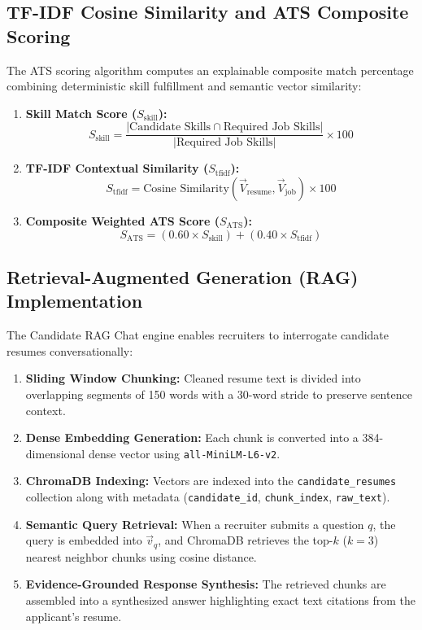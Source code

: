 \subsection{TF-IDF Cosine Similarity and ATS Composite Scoring}
The ATS scoring algorithm computes an explainable composite match percentage combining deterministic skill fulfillment and semantic vector similarity:
\begin{enumerate}
    \item \textbf{Skill Match Score ($S_{\text{skill}}$):}
    \begin{equation}
        S_{\text{skill}} = \frac{|\text{Candidate Skills} \cap \text{Required Job Skills}|}{|\text{Required Job Skills}|} \times 100
    \end{equation}
    \item \textbf{TF-IDF Contextual Similarity ($S_{\text{tfidf}}$):}
    \begin{equation}
        S_{\text{tfidf}} = \text{Cosine Similarity}(\vec{V}_{\text{resume}}, \vec{V}_{\text{job}}) \times 100
    \end{equation}
    \item \textbf{Composite Weighted ATS Score ($S_{\text{ATS}}$):}
    \begin{equation}
        S_{\text{ATS}} = (0.60 \times S_{\text{skill}}) + (0.40 \times S_{\text{tfidf}})
    \end{equation}
\end{enumerate}

\subsection{Retrieval-Augmented Generation (RAG) Implementation}
The Candidate RAG Chat engine enables recruiters to interrogate candidate resumes conversationally:
\begin{enumerate}
    \item \textbf{Sliding Window Chunking:} Cleaned resume text is divided into overlapping segments of 150 words with a 30-word stride to preserve sentence context.
    \item \textbf{Dense Embedding Generation:} Each chunk is converted into a 384-dimensional dense vector using \texttt{all-MiniLM-L6-v2}.
    \item \textbf{ChromaDB Indexing:} Vectors are indexed into the \texttt{candidate\_resumes} collection along with metadata (\texttt{candidate\_id}, \texttt{chunk\_index}, \texttt{raw\_text}).
    \item \textbf{Semantic Query Retrieval:} When a recruiter submits a question $q$, the query is embedded into $\vec{v}_q$, and ChromaDB retrieves the top-$k$ ($k=3$) nearest neighbor chunks using cosine distance.
    \item \textbf{Evidence-Grounded Response Synthesis:} The retrieved chunks are assembled into a synthesized answer highlighting exact text citations from the applicant's resume.
\end{enumerate}

